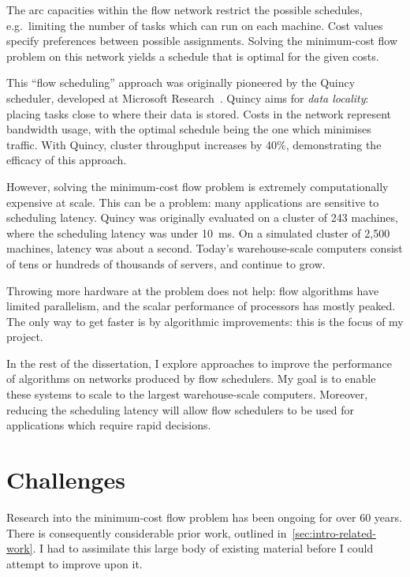 The arc capacities within the flow network restrict the possible schedules, e.g.\ limiting the number of tasks which can run on each machine. Cost values specify preferences between possible assignments. Solving the minimum-cost flow problem on this network yields a schedule that is optimal for the given costs.

This ``flow scheduling'' approach was originally pioneered by the Quincy scheduler, developed at Microsoft Research~\cite{Isard:2009}. Quincy aims for \emph{data locality}: placing tasks close to where their data is stored. Costs in the network represent bandwidth usage, with the optimal schedule being the one which minimises traffic. With Quincy, cluster throughput increases by 40\%, demonstrating the efficacy of this approach.

However, solving the minimum-cost flow problem is extremely computationally expensive at scale. This can be a problem: many applications are sensitive to scheduling latency. Quincy was originally evaluated on a cluster of 243 machines, where the scheduling latency was under \SI{10}{\milli\second}. On a simulated cluster of 2,500 machines, latency was about a second. Today's warehouse-scale computers consist of tens or hundreds of thousands of servers, and continue to grow.

Throwing more hardware at the problem does not help: flow algorithms have limited parallelism, and the scalar performance of processors has mostly peaked. The only way to get faster is by algorithmic improvements: this is the focus of my project.

In the rest of the dissertation, I explore approaches to improve the performance of algorithms on networks produced by flow schedulers. My goal is to enable these systems to scale to the largest warehouse-scale computers. Moreover, reducing the scheduling latency will allow flow schedulers to be used for applications which require rapid decisions.

\section{Challenges} \label{sec:intro-challenges}

Research into the minimum-cost flow problem has been ongoing for over 60 years. There is consequently considerable prior work, outlined in~\cref{sec:intro-related-work}. I had to assimilate this large body of existing material before I could attempt to improve upon it.


